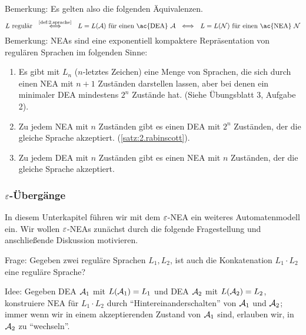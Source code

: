 {Bemerkung: Es gelten also die folgenden Äquivalenzen.
\[
L \text{ regulär} 
\ \ \stackrel{\text{\autoref{def:2.sprache}}}{\Longleftrightarrow} \ \ L = L(\A) \text{ für einen \ac{DEA} }\A
\ \ \Longleftrightarrow \ \ L = L(\calN) \text{ für einen \ac{NEA} }\calN
\]
Bemerkung: \ac{NEA}s sind eine exponentiell kompaktere Repräsentation von regulären Sprachen im folgenden Sinne:
\begin{enumerate}
 \item Es gibt mit $L_n$ ($n$-letztes Zeichen) eine Menge von Sprachen, die sich durch einen \ac{NEA} mit $n+1$ Zuständen darstellen lassen, aber bei denen ein minimaler \ac{DEA} mindestens $2^n$ Zustände hat. (Siehe Übungsblatt 3, Aufgabe 2).
 \item Zu jedem \ac{NEA} mit $n$ Zuständen gibt es einen \ac{DEA} mit $2^n$ Zuständen, der die gleiche Sprache akzeptiert. (\autoref{satz:2.rabinscott}).
 \item Zu jedem \ac{DEA} mit $n$ Zuständen gibt es einen \ac{NEA} mit $n$ Zuständen, der die gleiche Sprache akzeptiert.
\end{enumerate}

\subsubsection{\texorpdfstring{$\varepsilon$}{epsilon}-Übergänge}\label{sec:2.EpsNea}
In diesem Unterkapitel führen wir mit dem $\varepsilon$-NEA ein weiteres Automatenmodell ein. 
Wir wollen $\varepsilon$-NEAs zunächst durch die folgende Fragestellung und anschließende Diskussion motivieren.

Frage: Gegeben zwei reguläre Sprachen $L_1, L_2$, ist auch die Konkatenation $L_1\cdot L_2$ eine reguläre Sprache?

Idee: Gegeben \acs*{DEA} $\mathcal{A}_1$ mit $L(\mathcal{A}_1)=L_1$ und \acs*{DEA} $\mathcal{A}_2$ mit $L(\mathcal{A}_2)=L_2$,
konstruiere \acs*{NEA} für $L_1\cdot L_2$ durch "`Hintereinanderschalten"' von $\mathcal{A}_1$ und $\mathcal{A}_2$;
immer wenn wir in einem akzeptierenden Zustand von $\mathcal{A}_1$ sind, erlauben wir, in $\mathcal{A}_2$ zu "`wechseln"'.

}

